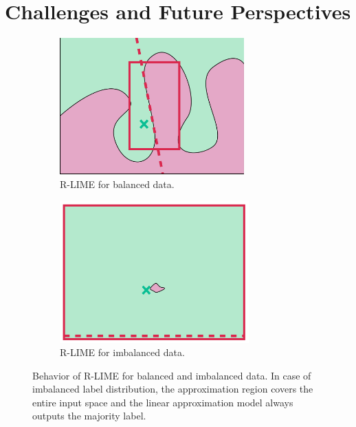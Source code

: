 \documentclass[runningheads]{llncs}
\begin{document}
\section{Challenges and Future Perspectives}
 {%
  \def\imgwidth{0.49\textwidth}
  \begin{figure}[t]
    \centering
    \begin{subfigure}[t]{\imgwidth}
      \centering
      \includegraphics[width=0.78\textwidth]{newlime}
      \caption{R-LIME for balanced data.}\label{fig:balanced}
    \end{subfigure}
    \begin{subfigure}[t]{\imgwidth}
      \centering
      \includegraphics[width=0.8\textwidth]{newlime_for_imbalanced_data}
      \caption{R-LIME for imbalanced data.
      }\label{fig:imbalanced}
    \end{subfigure}
    \caption{%
      Behavior of R-LIME for balanced and imbalanced data.
      In case of imbalanced label distribution,
      the approximation region covers the entire input space and the
      linear approximation model always outputs the majority label.
    }
    \vspace{10pt}
  \end{figure}
 }
\end{document}
